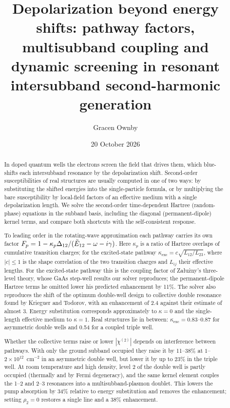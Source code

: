 \documentclass[11pt]{article}
\title{Depolarization beyond energy shifts: pathway factors, multisubband coupling and dynamic screening in resonant intersubband second-harmonic generation}
\author{Gracen Ownby}
\affil{University of Oklahoma, Norman, Oklahoma, USA}
\date{\small 20 October 2026}
\newcommand{\chitwo}{\chi^{(2)}}
\newcommand{\Et}{\tilde E}
\let\hbar\relax\DeclareRobustCommand{\hbar}{{\mathchar'26\mkern-9mu h}}
\begin{document}
\maketitle

\begin{abstract}
In doped quantum wells the electrons screen the field that drives them, which blue-shifts each intersubband resonance by the depolarization shift. Second-order susceptibilities of real structures are usually computed in one of two ways: by substituting the shifted energies into the single-particle formula, or by multiplying the bare susceptibility by local-field factors of an effective medium with a single depolarization length. We solve the second-order time-dependent Hartree (random-phase) equations in the subband basis, including the diagonal (permanent-dipole) kernel terms, and compare both shortcuts with the self-consistent response.

To leading order in the rotating-wave approximation each pathway carries its own factor $F_p=1-\kappa_p\Delta_{12}/(\Et_{12}-\hbar\omega-i\gamma)$. Here $\kappa_p$ is a ratio of Hartree overlaps of cumulative transition charges; for the excited-state pathway $\kappa_\mathrm{exc}=c\sqrt{L_{12}/L_{23}}$, where $|c|\le1$ is the shape correlation of the two transition charges and $L_{ij}$ their effective lengths. For the excited-state pathway this is the coupling factor of Załużny's three-level theory, whose GaAs step-well results our solver reproduces; the permanent-dipole Hartree terms he omitted lower his predicted enhancement by 11\%. The solver also reproduces the shift of the optimum double-well design to collective double resonance found by Krieguer and Todorov, with an enhancement of 2.4 against their estimate of almost 3. Energy substitution corresponds approximately to $\kappa=0$ and the single-length effective medium to $\kappa=1$. Real structures lie in between: $\kappa_\mathrm{exc}=0.83$--$0.87$ for asymmetric double wells and 0.54 for a coupled triple well.

Whether the collective terms raise or lower $|\chitwo|$ depends on interference between pathways. With only the ground subband occupied they raise it by 11--38\% at $1$--$2\times10^{12}$~cm$^{-2}$ in an asymmetric double well, but lower it by up to 23\% in the triple well. At room temperature and high density, level 2 of the double well is partly occupied (thermally and by Fermi degeneracy), and the same kernel element couples the 1--2 and 2--3 resonances into a multisubband-plasmon doublet. This lowers the pump absorption by 34\% relative to energy substitution and removes the enhancement; setting $\rho_2=0$ restores a single line and a 38\% enhancement.


\end{abstract}
\end{document}
